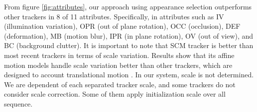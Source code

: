 From figure \ref{fig:attributes}, our approach using appearance selection
outperforms other trackers in 8 of 11 attributes. Specifically, in attributes
such as IV (illumination variation), OPR (out of plane rotation), OCC
(occlusion), DEF (deformation), MB (motion blur), IPR (in plane rotation),
OV (out of view), and BC (background clutter). It is important to note that SCM
tracker is better than most recent trackers in terms of scale variation.
Results show that its affine motion models handle scale
variation better than other trackers, which are designed to account
translational motion \cite{Zhong2012}. In our system, scale is not determined. We
are dependent of each separated tracker scale, and some trackers do not consider
scale correction. Some of them apply initialization scale over all sequence.



